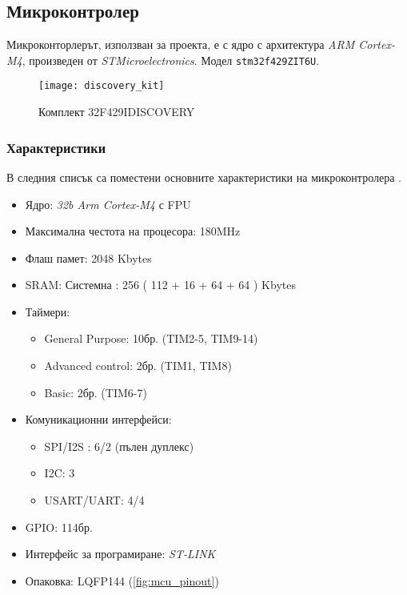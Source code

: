 \subsection{Микроконтролер}
\FloatBarrier

Микроконторлерът, използван за проекта, е с ядро с архитектура \textit{ARM Cortex-M4},
произведен от \textit{STMicroelectronics}.
Модел \texttt{stm32f429ZIT6U}.

\begin{figure}[htpb!]
    \centering
    \texttt{[image: discovery\_kit]}
    \caption{Комплект 32F429IDISCOVERY}
    \label{fig:discovery_kit}
\end{figure}

\subsubsection{Характеристики}

В следния списък са поместени основните характеристики
на микроконтролера \cite{stmmcudatasheet}.

\begin{itemize} 
    \item Ядро: \textit{32b Arm Cortex-M4} с FPU
    \item Максимална честота на процесора: 180MHz
    \item Флаш памет: 2048 Kbytes
    \item SRAM: Системна : 256 ( 112 + 16 + 64 + 64 ) Kbytes
    \item Таймери:
    \begin{itemize} 
        \item General Purpose: 10бр. (TIM2-5, TIM9-14)
        \item Advanced control: 2бр. (TIM1, TIM8)
        \item Basic: 2бр. (TIM6-7)
    \end{itemize}     
    \item Комуникационни интерфейси:
    \begin{itemize}
        \item SPI/I2S : 6/2 (пълен дуплекс) 
        \item I2C: 3
        \item USART/UART: 4/4
    \end{itemize} 
    \item GPIO: 114бр.
    \item Интерфейс за програмиране: \textit{ST-LINK}
    \item Опаковка: LQFP144 (\autoref{fig:mcu_pinout})
\end{itemize}



